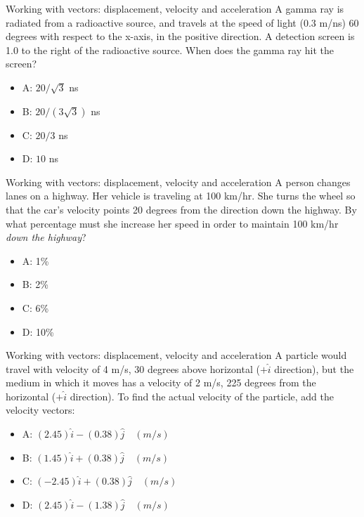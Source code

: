 \documentclass{beamer}
\begin{document}
\begin{frame}{Working with vectors: displacement, velocity and acceleration}
A gamma ray is radiated from a radioactive source, and travels at the speed of light (0.3 m/ns) 60 degrees with respect to the x-axis, in the positive direction.  A detection screen is 1.0 to the right of the radioactive source.  When does the gamma ray hit the screen?
\begin{itemize}
\item A: $20/\sqrt{3}$ ns
\item B: $20/(3\sqrt{3})$ ns
\item C: $20/3$ ns
\item D: $10$ ns
\end{itemize}
\end{frame}

\begin{frame}{Working with vectors: displacement, velocity and acceleration}
A person changes lanes on a highway.  Her vehicle is traveling at 100 km/hr.  She turns the wheel so that the car's velocity points 20 degrees from the direction down the highway.  By what percentage must she increase her speed in order to maintain 100 km/hr \textit{down the highway}?
\begin{itemize}
\item A: 1\%
\item B: 2\%
\item C: 6\%
\item D: 10\%
\end{itemize}
\end{frame}

\begin{frame}{Working with vectors: displacement, velocity and acceleration}
A particle would travel with velocity of 4 m/s, 30 degrees above horizontal ($+\hat{i}$ direction), but the medium in which it moves has a velocity of 2 m/s, 225 degrees from the horizontal ($+\hat{i}$ direction).  To find the actual velocity of the particle, add the velocity vectors:
\begin{itemize}
\item A: $(2.45)\hat{i}-(0.38)\hat{j} \quad (m/s)$
\item B: $(1.45)\hat{i}+(0.38)\hat{j} \quad (m/s)$
\item C: $(-2.45)\hat{i}+(0.38)\hat{j} \quad (m/s)$
\item D: $(2.45)\hat{i}-(1.38)\hat{j} \quad (m/s)$
\end{itemize}
\end{frame}
\end{document}
